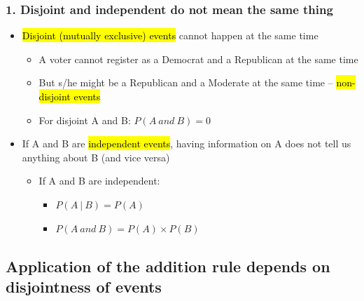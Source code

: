 \documentclass[11pt,containsverbatim,handout,xcolor=xelatex,dvipsnames,table]{beamer}
\begin{document}

\begin{frame}
\frametitle{1. Disjoint and independent do not mean the same thing}

\begin{itemize}

\item \hl{Disjoint (mutually exclusive) events} cannot happen at the same time
\begin{itemize}
\item A voter cannot register as a Democrat and a Republican at the same time
\item But s/he might be a Republican and a Moderate at the same time -- \hl{non-disjoint events}
\item For disjoint A and B: $P(A~and~B) = 0$
\end{itemize}

\pause

\item If A and B are \hl{independent events}, having information on A does not tell us anything about B (and vice versa)
\begin{itemize}
\item If A and B are independent: 
\begin{itemize}
\item $P(A~|~B) = P(A)$
\item $P(A~and~B) = P(A) \times P(B)$
\end{itemize}
\end{itemize}

\end{itemize}

\end{frame}


\subsection{Application of the addition rule depends on disjointness of events}
\label{mi2}

\end{document}
